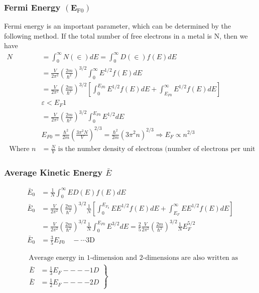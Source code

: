 \subsubsection{Fermi Energy $\left(\mathbf{E}_{\mathrm{F} 0}\right)$ }
 Fermi energy is an important parameter, which can be determined by the following method. If the total number of free electrons in a metal is $\mathrm{N}$, then we have
\begin{align*}
N&=\int_{0}^{\infty} N(\in) d E=\int_{0}^{\infty} D(\in) f(E) d E \\
&=\frac{V}{2 \pi^{2}}\left(\frac{2 m}{\hbar^{2}}\right)^{3 / 2} \int_{0}^{\infty} E^{1 / 2} f(E) d E \\
&=\frac{V}{2 \pi^{2}}\left(\frac{2 m}{\hbar^{2}}\right)^{3 / 2}\left[\int_{0}^{E_{F 0}} E^{1 / 2} f(E) d E+\int_{E_{F 0}}^{\infty} E^{1 / 2} f(E) d E\right] \\
&\varepsilon<E_{F} 1 \\
&=\frac{V}{2 \pi^{2}}\left(\frac{2 m}{\hbar^{2}}\right)^{3 / 2} \int_{0}^{E_{F 0}} E^{1 / 2} d E \\
&E_{F 0}=\frac{\hbar^{2}}{2 m}\left(\frac{3 \pi^{2} N}{V}\right)^{2 / 3}=\frac{\hbar^{2}}{2 m}\left(3 \pi^{2} n\right)^{2 / 3} \Rightarrow E_{F} \propto n^{2 / 3}\\
\text { Where } n&=\frac{N}{V} \text { is the number density of electrons (number of electrons per unit volume). }
\end{align*}
\subsubsection{Average Kinetic Energy $\bar{E}$}
\begin{align*}
\bar{E}_{0}&=\frac{1}{N} \int_{0}^{\infty} E D(E) f(E) d E \\
\bar{E}_{0}&=\frac{V}{2 \pi^{2}}\left(\frac{2 m}{\hbar^{2}}\right)^{3 / 2} \frac{1}{N}\left[\int_{0}^{E_{F_{0}}} E E^{1 / 2} f(E) d E+\int_{E_{F}}^{\infty} E E^{1 / 2} f(E) d E\right]\\
&=\frac{V}{2 \pi^{2}}\left(\frac{2 m}{\hbar^{2}}\right)^{3 / 2} \frac{1}{N} \int_{0}^{E_{F 0}} E^{3 / 2} d E=\frac{2}{5} \frac{V}{2 \pi^{2}}\left(\frac{2 m}{\hbar^{2}}\right)^{3 / 2} \frac{1}{N} E_{F}^{5 / 2} \\
\bar{E}_{0}&=\frac{3}{5} E_{F 0} \quad-\cdots 3 \mathrm{D}
\end{align*}
\begin{note}
	\begin{align*}
		&\text {  Average }\text{energy in 1-dimension and 2-dimensions are also written as }\\
&\left.\begin{array}{ll}
\bar{E}&=\frac{1}{3} E_{F}  ----1 D \\
\bar{E}&=\frac{1}{2} E_{F}  ----2 D
\end{array}\right\}
	\end{align*}
\end{note}
